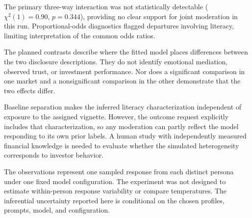 The primary three-way interaction was not statistically detectable ($\chi^2(1)=0.90$, $p=0.344$), providing no clear support for joint moderation in this run. Proportional-odds diagnostics flagged departures involving literacy, limiting interpretation of the common odds ratios.

The planned contrasts describe where the fitted model places differences between the two disclosure descriptions. They do not identify emotional mediation, observed trust, or investment performance. Nor does a significant comparison in one market and a nonsignificant comparison in the other demonstrate that the two effects differ.

Baseline separation makes the inferred literacy characterization independent of exposure to the assigned vignette. However, the outcome request explicitly includes that characterization, so any moderation can partly reflect the model responding to its own prior labels. A human study with independently measured financial knowledge is needed to evaluate whether the simulated heterogeneity corresponds to investor behavior.

The observations represent one sampled response from each distinct persona under one fixed model configuration. The experiment was not designed to estimate within-person response variability or compare temperatures. The inferential uncertainty reported here is conditional on the chosen profiles, prompts, model, and configuration.
